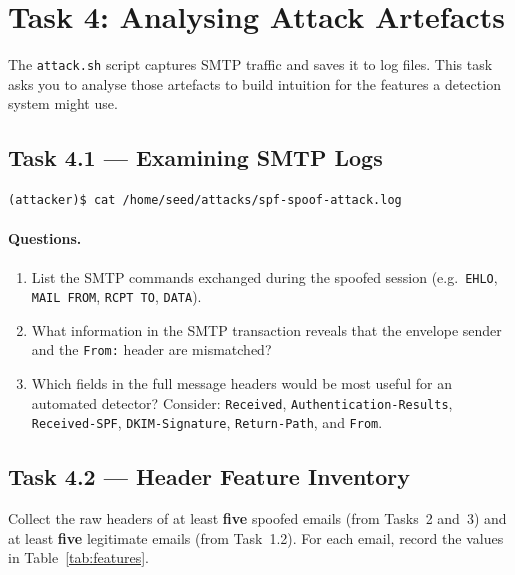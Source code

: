 \documentclass[11pt]{article}
\newcounter{task}
\begin{document}
\section{Task 4: Analysing Attack Artefacts}

The \texttt{attack.sh} script captures SMTP traffic and saves it to
log files.
This task asks you to analyse those artefacts to build intuition for
the features a detection system might use.

\subsection{Task 4.1 --- Examining SMTP Logs}

\begin{listing}[H]
\begin{verbatim}
(attacker)$ cat /home/seed/attacks/spf-spoof-attack.log
\end{verbatim}
\end{listing}

\paragraph{Questions.}
\begin{enumerate}[noitemsep]
  \item List the SMTP commands exchanged during the spoofed session
    (e.g.\ \texttt{EHLO}, \texttt{MAIL FROM}, \texttt{RCPT TO},
    \texttt{DATA}).
  \item What information in the SMTP transaction reveals that the
    envelope sender and the \texttt{From:} header are mismatched?
  \item Which fields in the full message headers would be most useful
    for an automated detector?
    Consider: \texttt{Received}, \texttt{Authentication-Results},
    \texttt{Received-SPF}, \texttt{DKIM-Signature}, \texttt{Return-Path},
    and \texttt{From}.
\end{enumerate}

\subsection{Task 4.2 --- Header Feature Inventory}

Collect the raw headers of at least \textbf{five} spoofed emails
(from Tasks~2 and~3) and at least \textbf{five} legitimate emails
(from Task~1.2).
For each email, record the values in Table~\ref{tab:features}.
\end{document}
